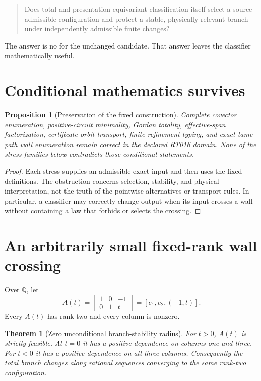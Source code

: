 \documentclass[11pt]{article}
\newtheorem{theorem}{Theorem}
\newtheorem{proposition}{Proposition}
\newcommand{\Q}{\mathbb{Q}}
\begin{document}
\begin{quote}
Does total and presentation-equivariant classification itself select a
source-admissible configuration and protect a stable, physically relevant
branch under independently admissible finite changes?
\end{quote}

The answer is no for the unchanged candidate.  That answer leaves the
classifier mathematically useful.

\section{Conditional mathematics survives}

\begin{proposition}[Preservation of the fixed construction]
Complete covector enumeration, positive-circuit minimality, Gordan totality,
effective-span factorization, certificate-orbit transport, finite-refinement
typing, and exact tame-path wall enumeration remain correct in the declared
RT016 domain.  None of the stress families below contradicts those conditional
statements.
\end{proposition}

\begin{proof}
Each stress supplies an admissible exact input and then uses the fixed
definitions.  The obstruction concerns selection, stability, and physical
interpretation, not the truth of the pointwise alternatives or transport
rules.  In particular, a classifier may correctly change output when its
input crosses a wall without containing a law that forbids or selects the
crossing.
\end{proof}

\section{An arbitrarily small fixed-rank wall crossing}

Over $\Q$, let
\[
 A(t)=\begin{bmatrix}1&0&-1\\0&1&t\end{bmatrix}
      =[e_1,e_2,(-1,t)].
\]
Every $A(t)$ has rank two and every column is nonzero.

\begin{theorem}[Zero unconditional branch-stability radius]
For $t>0$, $A(t)$ is strictly feasible.  At $t=0$ it has a positive
dependence on columns one and three.  For $t<0$ it has a positive dependence
on all three columns.  Consequently the total branch changes along rational
sequences converging to the same rank-two configuration.
\end{theorem}
\end{document}
